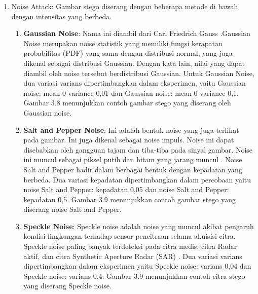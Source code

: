 \documentclass{ittelkom}
\begin{document}
\begin{enumerate}
    \item Noise Attack: Gambar stego diserang dengan beberapa metode di bawah dengan
          intensitas yang berbeda.
          \begin{enumerate}
              \item \textbf{Gaussian Noise}: Nama ini diambil dari Carl Friedrich Gauss
                    \cite{selamistudy}.Gaussian Noise merupakan noise statistik yang memiliki
                    fungsi kerapatan probabilitas (PDF) yang sama dengan distribusi normal, yang
                    juga dikenal sebagai distribusi Gaussian. Dengan kata lain, nilai yang dapat
                    diambil oleh noise tersebut berdistribusi Gaussian. Untuk Gaussian Noise, dua
                    variasi varians dipertimbangkan dalam eksperimen, yaitu Gaussian noise: mean 0
                    variance 0,01 dan Gaussian noise: mean 0 variance 0,1. Gambar 3.8 menunjukkan
                    contoh gambar stego yang diserang oleh Gaussian noise.
              \item \textbf{Salt and Pepper Noise}: Ini adalah bentuk noise yang juga terlihat pada
                    gambar. Ini juga dikenal sebagai noise impuls. Noise ini dapat disebabkan oleh
                    gangguan tajam dan tiba-tiba pada sinyal gambar. Noise ini muncul sebagai
                    piksel putih dan hitam yang jarang muncul \cite{kaisar2008salt}. Noise Salt and Pepper hadir
                    dalam berbagai bentuk dengan kepadatan yang berbeda. Dua variasi kepadatan
                    dipertimbangkan dalam percobaan yaitu noise Salt and Pepper: kepadatan 0,05 dan
                    noise Salt and Pepper: kepadatan 0,5. Gambar 3.9 menunjukkan contoh gambar
                    stego yang diserang noise Salt and Pepper.
              \item \textbf{Speckle Noise}: Speckle noise adalah noise yang muncul akibat pengaruh kondisi
                    lingkungan terhadap sensor pencitraan selama akuisisi citra. Speckle noise
                    paling banyak terdeteksi pada citra medis, citra Radar aktif, dan citra
                    Synthetic Aperture Radar (SAR) \cite{mansourpour2006effects}. Dua variasi varians dipertimbangkan dalam
                    eksperimen yaitu Speckle noise: varians 0,04 dan Speckle noise: varians 0,4.
                    Gambar 3.9 menunjukkan contoh citra stego yang diserang Speckle noise.
          \end{enumerate}


\end{enumerate}
\end{document}
